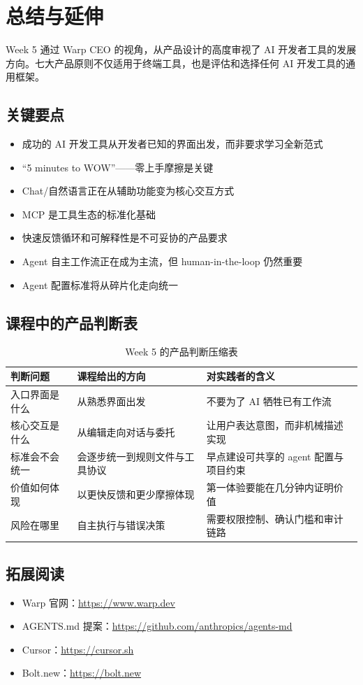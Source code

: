 \section{总结与延伸}

Week 5 通过 Warp CEO 的视角，从产品设计的高度审视了 AI 开发者工具的发展方向。七大产品原则不仅适用于终端工具，也是评估和选择任何 AI 开发工具的通用框架。

\subsection{关键要点}

\begin{itemize}
    \item 成功的 AI 开发工具从开发者已知的界面出发，而非要求学习全新范式
    \item ``5 minutes to WOW''——零上手摩擦是关键
    \item Chat/自然语言正在从辅助功能变为核心交互方式
    \item MCP 是工具生态的标准化基础
    \item 快速反馈循环和可解释性是不可妥协的产品要求
    \item Agent 自主工作流正在成为主流，但 human-in-the-loop 仍然重要
    \item Agent 配置标准将从碎片化走向统一
\end{itemize}

\subsection{课程中的产品判断表}

\begin{table}[H]
\centering
\begin{tabular}{p{} p{} p{}}
\toprule
判断问题 & 课程给出的方向 & 对实践者的含义 \\
\midrule
入口界面是什么 & 从熟悉界面出发 & 不要为了 AI 牺牲已有工作流 \\
核心交互是什么 & 从编辑走向对话与委托 & 让用户表达意图，而非机械描述实现 \\
标准会不会统一 & 会逐步统一到规则文件与工具协议 & 早点建设可共享的 agent 配置与项目约束 \\
价值如何体现 & 以更快反馈和更少摩擦体现 & 第一体验要能在几分钟内证明价值 \\
风险在哪里 & 自主执行与错误决策 & 需要权限控制、确认门槛和审计链路 \\
\bottomrule
\end{tabular}
\caption{Week 5 的产品判断压缩表}
\end{table}

\subsection{拓展阅读}

\begin{itemize}
    \item Warp 官网：\url{https://www.warp.dev}
    \item AGENTS.md 提案：\url{https://github.com/anthropics/agents-md}
    \item Cursor：\url{https://cursor.sh}
    \item Bolt.new：\url{https://bolt.new}
\end{itemize}



